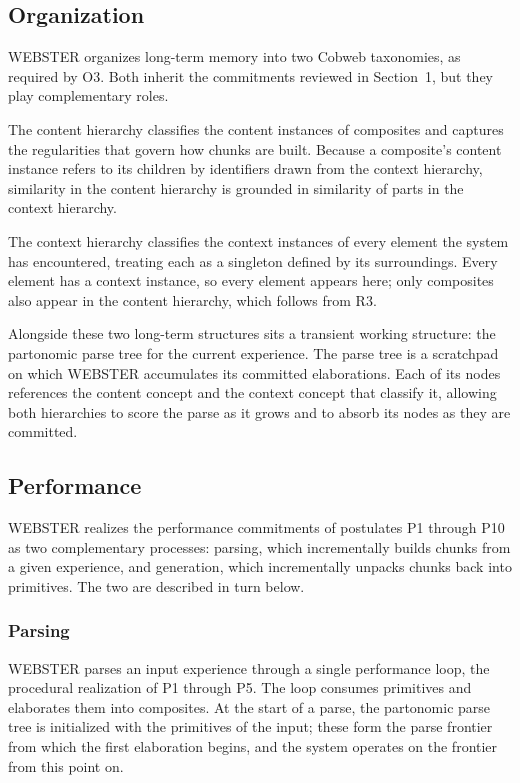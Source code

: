 \documentclass{article}
\begin{document}
\subsection{Organization}

WEBSTER organizes long-term memory into two Cobweb taxonomies, as required by O3. Both inherit the commitments reviewed in Section~1, but they play complementary roles.

The content hierarchy classifies the content instances of composites and captures the regularities that govern how chunks are built. Because a composite's content instance refers to its children by identifiers drawn from the context hierarchy, similarity in the content hierarchy is grounded in similarity of parts in the context hierarchy.

The context hierarchy classifies the context instances of every element the system has encountered, treating each as a singleton defined by its surroundings. Every element has a context instance, so every element appears here; only composites also appear in the content hierarchy, which follows from R3.

Alongside these two long-term structures sits a transient working structure: the partonomic parse tree for the current experience. The parse tree is a scratchpad on which WEBSTER accumulates its committed elaborations. Each of its nodes references the content concept and the context concept that classify it, allowing both hierarchies to score the parse as it grows and to absorb its nodes as they are committed.

\subsection{Performance}

WEBSTER realizes the performance commitments of postulates P1 through P10 as two complementary processes: parsing, which incrementally builds chunks from a given experience, and generation, which incrementally unpacks chunks back into primitives. The two are described in turn below.

\subsubsection{Parsing}

WEBSTER parses an input experience through a single performance loop, the procedural realization of P1 through P5. The loop consumes primitives and elaborates them into composites. At the start of a parse, the partonomic parse tree is initialized with the primitives of the input; these form the parse frontier from which the first elaboration begins, and the system operates on the frontier from this point on.
\end{document}
